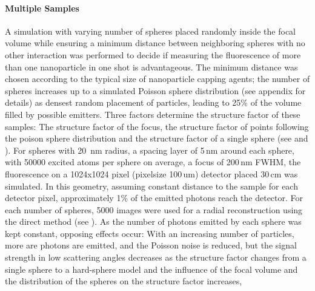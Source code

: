 



\paragraph{Multiple Samples}

A simulation with varying number of spheres placed randomly inside the focal volume while ensuring a minimum distance between neighboring spheres with no other interaction was performed to decide if measuring the fluorescence of more than one nanoparticle in one shot is advantageous.
The minimum distance was chosen according to the typical size of nanoparticle capping agents; the number of spheres increases up to a simulated Poisson sphere distribution (see appendix  for details) as densest random placement of particles, leading to 25\% of the volume filled by possible emitters.
Three factors determine the structure factor of these samples: The structure factor of the focus, the structure factor of points following the poison sphere distribution  and the structure factor of a single sphere (see  and ). 
For spheres with 20\, nm radius, a spacing layer of 5\,nm around each sphere, with  50000 excited atoms per sphere on average, a focus of 200\,nm FWHM, the fluorescence on a 1024x1024 pixel (pixelsize 100\,um) detector placed 30\,cm was simulated. In this geometry, assuming constant distance to the sample for each detector pixel, approximately 1\% of the emitted photons reach the detector.  For each number of spheres, 5000 images were used for a radial reconstruction using the direct method (see ).
As the number of photons emitted by each sphere was kept constant, opposing effects occur:  With an increasing number of particles, more are photons are emitted, and the Poisson noise is reduced, but the signal strength in low scattering angles decreases as the structure factor changes from a single sphere to a hard-sphere model and the influence of the focal volume and the distribution of the spheres on the structure factor increases, 

